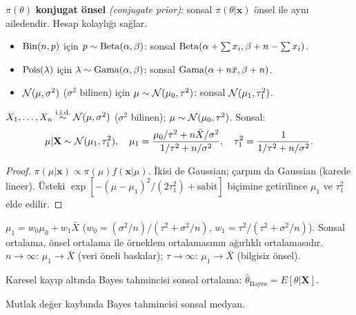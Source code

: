 \begin{tanim}\label{def:konjugat_onsel}
$\pi(\theta)$ \textbf{konjugat önsel} \emph{(conjugate prior)}: sonsal $\pi(\theta|\mathbf{x})$ önsel ile aynı ailedendir. Hesap kolaylığı sağlar.
\begin{itemize}
  \item $\operatorname{Bin}(n,p)$ için $p\sim\operatorname{Beta}(\alpha,\beta)$: sonsal $\operatorname{Beta}(\alpha+\sum x_i, \beta+n-\sum x_i)$.
  \item $\operatorname{Pois}(\lambda)$ için $\lambda\sim\operatorname{Gama}(\alpha,\beta)$: sonsal $\operatorname{Gama}(\alpha+n\bar x, \beta+n)$.
  \item $\mathcal{N}(\mu,\sigma^2)$ ($\sigma^2$ bilinen) için $\mu\sim\mathcal{N}(\mu_0,\tau^2)$: sonsal $\mathcal{N}(\mu_1,\tau_1^2)$.
\end{itemize}
\end{tanim}

\begin{teorem}\label{thm:normal_konjugat}
$X_1,\ldots,X_n\overset{\text{i.i.d.}}{\sim}\mathcal{N}(\mu,\sigma^2)$ ($\sigma^2$ bilinen); $\mu\sim\mathcal{N}(\mu_0,\tau^2)$. Sonsal:
\[
  \mu|\mathbf{X}\sim\mathcal{N}(\mu_1,\tau_1^2), \quad
  \mu_1 = \frac{\mu_0/\tau^2 + n\bar{X}/\sigma^2}{1/\tau^2+n/\sigma^2}, \quad
  \tau_1^2 = \frac{1}{1/\tau^2+n/\sigma^2}.
\]
\end{teorem}

\begin{proof}
$\pi(\mu|\mathbf{x})\propto\pi(\mu)f(\mathbf{x}|\mu)$. İkisi de Gaussian; çarpım da Gaussian (karede lineer). Üsteki $\exp[-(\mu-\mu_1)^2/(2\tau_1^2)+\text{sabit}]$ biçimine getirilince $\mu_1$ ve $\tau_1^2$ elde edilir.
\end{proof}

\begin{ornek}
$\mu_1 = w_0\mu_0 + w_1\bar{X}$ ($w_0=(\sigma^2/n)/(\tau^2+\sigma^2/n)$, $w_1=\tau^2/(\tau^2+\sigma^2/n)$). Sonsal ortalama, önsel ortalama ile örneklem ortalamasının ağırlıklı ortalamasıdır. $n\to\infty$: $\mu_1\to\bar{X}$ (veri öneli baskılar); $\tau\to\infty$: $\mu_1\to\bar{X}$ (bilgisiz önsel).
\end{ornek}

\begin{teorem}\label{thm:bayes_tahmin}
Karesel kayıp altında Bayes tahmincisi sonsal ortalama: $\hat\theta_{\text{Bayes}}=E[\theta|\mathbf{X}]$.

Mutlak değer kaybında Bayes tahmincisi sonsal medyan.
\end{teorem}

